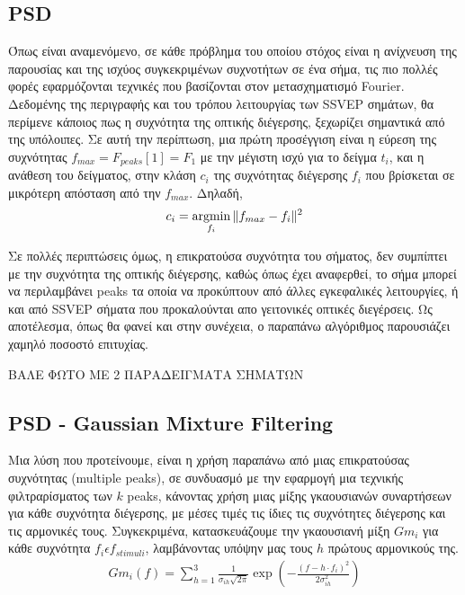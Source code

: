 \documentclass[11pt,a4paper,english,greek,twoside]{../Thesis}
\begin{document}
\subsection{PSD}
\par Όπως είναι αναμενόμενο, σε κάθε πρόβλημα του οποίου στόχος είναι η ανίχνευση της παρουσίας και της ισχύος συγκεκριμένων συχνοτήτων σε ένα σήμα, τις πιο πολλές φορές εφαρμόζονται τεχνικές που βασίζονται στον μετασχηματισμό Fourier. Δεδομένης της περιγραφής και του τρόπου λειτουργίας των SSVEP σημάτων, θα περίμενε κάποιος πως η συχνότητα της οπτικής διέγερσης, ξεχωρίζει σημαντικά από της υπόλοιπες. Σε αυτή την περίπτωση, μια πρώτη προσέγγιση είναι η εύρεση της συχνότητας $f_{max}=F_{peaks}[1]=F_1$ με την μέγιστη ισχύ για το δείγμα $t_i$, και η ανάθεση του δείγματος, στην κλάση $c_i$ της συχνότητας διέγερσης $f_i$ που βρίσκεται σε μικρότερη απόσταση από την $f_{max}$. Δηλαδή,
\begin{align}%
    c_i=\argmin_{f_i} \Vert f_{max}-f_i \Vert ^2
\end{align}
\par Σε πολλές περιπτώσεις όμως, η επικρατούσα συχνότητα του σήματος, δεν συμπίπτει με την συχνότητα της οπτικής διέγερσης, καθώς όπως έχει αναφερθεί, το σήμα μπορεί να περιλαμβάνει peaks τα οποία να προκύπτουν από άλλες εγκεφαλικές λειτουργίες, ή και από SSVEP σήματα που προκαλούνται απο γειτονικές οπτικές διεγέρσεις. Ως αποτέλεσμα, όπως θα φανεί και στην συνέχεια, ο παραπάνω αλγόριθμος παρουσιάζει χαμηλό ποσοστό επιτυχίας.
\par ΒΑΛΕ ΦΩΤΟ ΜΕ 2 ΠΑΡΑΔΕΙΓΜΑΤΑ ΣΗΜΑΤΩΝ

\subsection{PSD - Gaussian Mixture Filtering}
\par Μια λύση που προτείνουμε, είναι η χρήση παραπάνω από μιας επικρατούσας συχνότητας (multiple peaks), σε συνδυασμό με την εφαρμογή μια τεχνικής φιλτραρίσματος των $k$ peaks, κάνοντας χρήση μιας μίξης γκαουσιανών συναρτήσεων για κάθε συχνότητα διέγερσης, με μέσες τιμές τις ίδιες τις συχνότητες διέγερσης και τις αρμονικές τους. Συγκεκριμένα, κατασκευάζουμε την γκαουσιανή μίξη $Gm_i$ για κάθε συχνότητα $f_i\epsilon f_{stimuli}$, λαμβάνοντας υπόψην μας τους $h$ πρώτους αρμονικούς της. 
\begin{align}%
    Gm_i(f)=\sum_{h=1}^{3}\frac{1}{\sigma_{ih} \sqrt{2 \pi}}\exp(-\frac{(f-h\cdot f_i)^2}{2 \sigma_{ih}^2})
\end{align}
\end{document}
